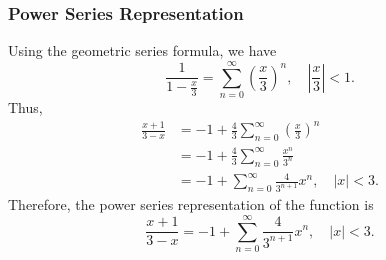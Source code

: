 \subsubsection{Power Series Representation}
Using the geometric series formula, we have
\[
\frac{1}{1 - \frac{x}{3}} = \sum_{n=0}^{\infty} {\left( \frac{x}{3} \right)}^n, \quad \left| \frac{x}{3} \right| < 1.
\]
Thus,
\begin{align*}
\frac{x + 1}{3 - x} &= -1 + \frac{4}{3} \sum_{n=0}^{\infty} {\left( \frac{x}{3} \right)}^n \\
&= -1 + \frac{4}{3} \sum_{n=0}^{\infty} \frac{x^n}{3^n} \\
&= -1 + \sum_{n=0}^{\infty} \frac{4}{3^{n+1}} x^n, \quad |x| < 3.
\end{align*}
Therefore, the power series representation of the function is
\[
\frac{x + 1}{3 - x} = -1 + \sum_{n=0}^{\infty} \frac{4}{3^{n+1}} x^n, \quad |x| < 3.
\]
